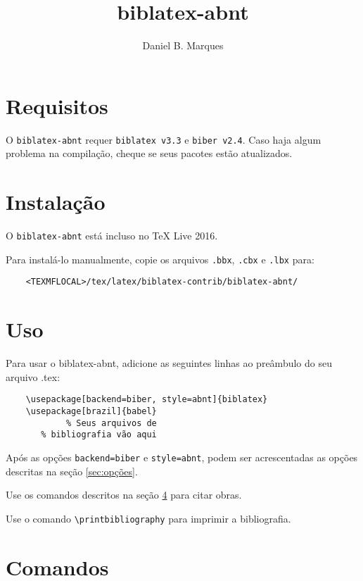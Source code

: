 \documentclass[a4paper]{article}
\title{biblatex-abnt}
\author{Daniel B. Marques}
\begin{document}
\maketitle

\tableofcontents

\clearpage
\section{Requisitos}

O \texttt{biblatex-abnt} requer \texttt{biblatex v3.3} e \texttt{biber v2.4}. Caso haja algum problema na compilação, cheque se seus pacotes estão atualizados.

\section{Instalação}

O \texttt{biblatex-abnt} está incluso no TeX Live 2016.

Para instalá-lo manualmente, copie os arquivos \texttt{.bbx}, \texttt{.cbx} e \texttt{.lbx} para:
\begin{verbatim}
    <TEXMFLOCAL>/tex/latex/biblatex-contrib/biblatex-abnt/
\end{verbatim}

\section{Uso}

Para usar o {biblatex-abnt}, adicione as seguintes linhas ao preâmbulo do seu arquivo {.tex}:

\begin{verbatim}
    \usepackage[backend=biber, style=abnt]{biblatex}
    \usepackage[brazil]{babel}
            % Seus arquivos de
       % bibliografia vão aqui
\end{verbatim}

Após as opções \texttt{backend=biber} e \texttt{style=abnt}, podem ser acrescentadas as opções descritas na seção \ref{sec:opções}.

Use os comandos descritos na seção \ref{sec:comandos} para citar obras.

Use o comando \verb"\printbibliography" para imprimir a bibliografia.

\clearpage
\section{Comandos}
\label{sec:comandos}
\end{document}
